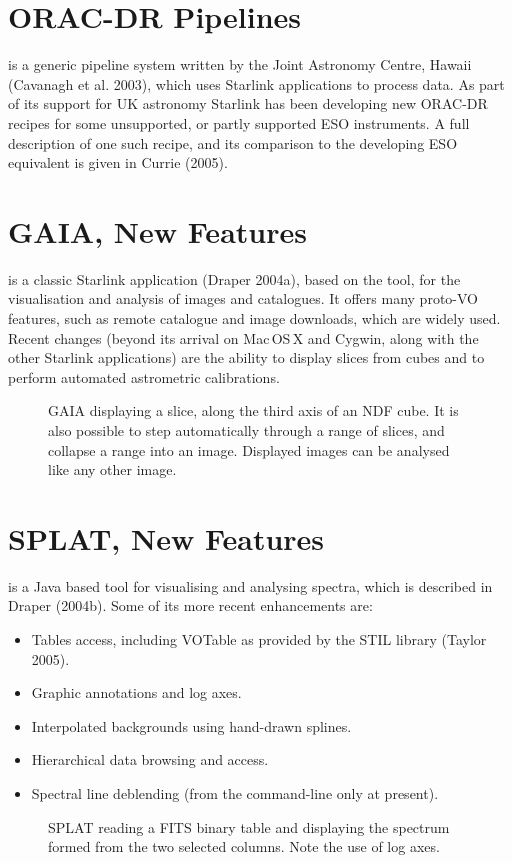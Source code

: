 \documentclass[11pt,twoside]{article}  %
\begin{document}
\section{ORAC-DR Pipelines}

is a generic pipeline system written by the Joint Astronomy Centre,
Hawaii (Cavanagh et al. 2003), which uses Starlink applications to process
data. As part of its support for UK astronomy Starlink has been developing new
ORAC-DR recipes for some unsupported, or partly supported ESO instruments. A
full description of one such recipe, and its comparison to the developing ESO
equivalent is given in Currie (2005).

\section{GAIA, New Features}

 is a classic
Starlink application (Draper 2004a), based on the
 tool, for the
visualisation and analysis of images and catalogues. 
It offers many proto-VO features, such as remote catalogue and image
downloads, which are widely used. 
Recent changes (beyond its arrival on Mac\,OS\,X and Cygwin, along with the
other Starlink applications) are the ability to display slices from cubes and
to perform automated astrometric calibrations.

\begin{figure}
\caption{GAIA displaying a slice, along the third axis of an NDF cube. It is
also possible to step automatically through a range of slices, and collapse
a range into an image. Displayed images can be analysed like any other image.}
\end{figure}

\section{SPLAT, New Features}
is a Java based tool for visualising and analysing spectra, which is
described in Draper (2004b). Some of its more recent enhancements are:
\begin{itemize}
\item Tables access, including VOTable as provided by the STIL library
(Taylor 2005).
\item Graphic annotations and log axes.
\item Interpolated backgrounds using hand-drawn splines.
\item Hierarchical data browsing and access.
\item Spectral line deblending (from the command-line only at present).
\end{itemize}
\begin{figure}
\caption{SPLAT reading a FITS binary table and displaying the spectrum formed
from the two selected columns. Note the use of log axes.}
\end{figure}
\end{document}
